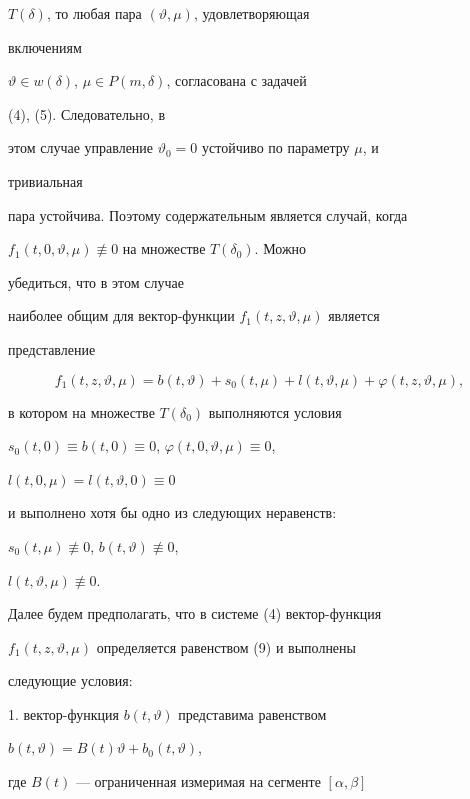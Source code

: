$T(\delta)$, то любая пара $(\vartheta,\mu)$, удовлетворяющая 


включениям 


$\vartheta\in w(\delta)$, $\mu\in P(m,\delta)$, согласована с задачей 


(4), (5). Следовательно, в 


этом случае управление $\vartheta_0=0$ устойчиво по параметру $\mu$, и 


тривиальная 


пара устойчива. Поэтому содержательным является случай, когда 


$f_1(t,0,\vartheta,\mu)\not\equiv0$ на множестве $T(\delta_0)$. Можно 


убедиться, что в этом случае 


наиболее общим для вектор-функции $f_1(t,z,\vartheta,\mu)$ является 


представление 


\begin{equation} 


f_1(t,z,\vartheta,\mu)=b(t,\vartheta)+s_0(t,\mu)+ 


l(t,\vartheta,\mu)+\varphi(t,z,\vartheta,\mu), 


\end{equation} 


в котором на множестве $T(\delta_0)$ выполняются условия 


$s_0(t,0)\equiv b(t,0)\equiv0$, $\varphi(t,0,\vartheta,\mu)\equiv0$, 


$l(t,0,\mu)=l(t,\vartheta,0)\equiv0$ 


и выполнено хотя бы одно из следующих неравенств: 


$s_0(t,\mu)\not\equiv0$, $b(t,\vartheta)\not\equiv0$, 


$l(t,\vartheta,\mu)\not\equiv0$. 


 


Далее будем предполагать, что в системе (4) вектор-функция 


$f_1(t,z,\vartheta,\mu)$ определяется равенством (9) и выполнены 


следующие условия: 


 


1. вектор-функция $b(t,\vartheta)$ представима равенством 


$b(t,\vartheta)=B(t)\vartheta+b_0(t,\vartheta)$, 


где $B(t)$ --- ограниченная измеримая на сегменте $[\alpha,\beta]$\; 


